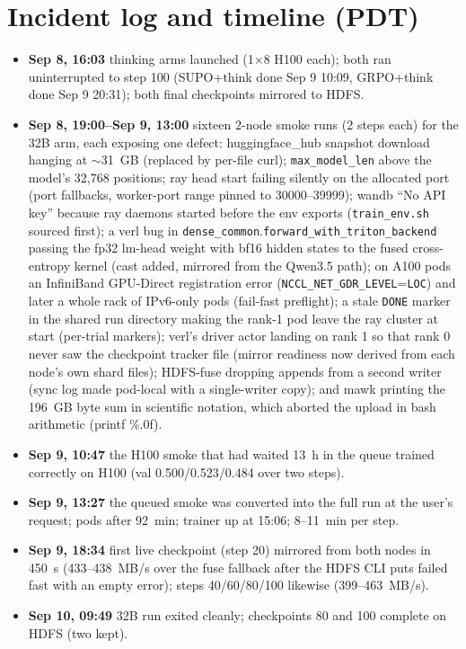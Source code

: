 \documentclass[11pt]{article}
\newcommand{\p}[1]{\texttt{#1}}
\begin{document}
\section{Incident log and timeline (PDT)}
\begin{itemize}[nosep]
\item \textbf{Sep 8, 16:03} thinking arms launched (1$\times$8 H100 each); both ran uninterrupted to step 100 (SUPO+think done Sep 9 10:09, GRPO+think done Sep 9 20:31); both final checkpoints mirrored to HDFS.
\item \textbf{Sep 8, 19:00--Sep 9, 13:00} sixteen 2-node smoke runs (2 steps each) for the 32B arm, each exposing one defect: huggingface\_hub snapshot download hanging at $\sim$31~GB (replaced by per-file curl); \p{max\_model\_len} above the model's 32{,}768 positions; ray head start failing silently on the allocated port (port fallbacks, worker-port range pinned to 30000--39999); wandb ``No API key'' because ray daemons started before the env exports (\p{train\_env.sh} sourced first); a verl bug in \p{dense\_common}.\allowbreak\p{forward\_with\_triton\_backend} passing the fp32 lm-head weight with bf16 hidden states to the fused cross-entropy kernel (cast added, mirrored from the Qwen3.5 path); on A100 pods an InfiniBand GPU-Direct registration error (\p{NCCL\_NET\_GDR\_LEVEL}\allowbreak=\p{LOC}) and later a whole rack of IPv6-only pods (fail-fast preflight); a stale \p{DONE} marker in the shared run directory making the rank-1 pod leave the ray cluster at start (per-trial markers); verl's driver actor landing on rank 1 so that rank 0 never saw the checkpoint tracker file (mirror readiness now derived from each node's own shard files); HDFS-fuse dropping appends from a second writer (sync log made pod-local with a single-writer copy); and mawk printing the 196~GB byte sum in scientific notation, which aborted the upload in bash arithmetic (printf \%.0f).
\item \textbf{Sep 9, 10:47} the H100 smoke that had waited 13~h in the queue trained correctly on H100 (val 0.500/0.523/0.484 over two steps).
\item \textbf{Sep 9, 13:27} the queued smoke was converted into the full run at the user's request; pods after 92~min; trainer up at 15:06; 8--11~min per step.
\item \textbf{Sep 9, 18:34} first live checkpoint (step 20) mirrored from both nodes in 450~s (433--438~MB/s over the fuse fallback after the HDFS CLI puts failed fast with an empty error); steps 40/60/80/100 likewise (399--463~MB/s).
\item \textbf{Sep 10, 09:49} 32B run exited cleanly; checkpoints 80 and 100 complete on HDFS (two kept).
\end{itemize}
\end{document}

